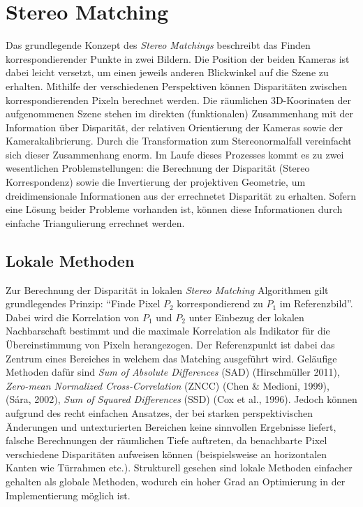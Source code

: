 \section{Stereo Matching}
\label{sec:stereo_matching}
Das grundlegende Konzept des \emph{Stereo Matchings} beschreibt das Finden korrespondierender Punkte in zwei Bildern. Die Position der beiden Kameras ist dabei leicht versetzt, um einen jeweils anderen Blickwinkel auf die Szene zu erhalten. Mithilfe der verschiedenen Perspektiven können Disparitäten zwischen korrespondierenden Pixeln berechnet werden. Die räumlichen 3D-Koorinaten der aufgenommenen Szene stehen im direkten (funktionalen) Zusammenhang mit der Information über Disparität, der  relativen Orientierung der Kameras sowie der Kamerakalibrierung. Durch die Transformation zum Stereonormalfall vereinfacht sich dieser Zusammenhang enorm. Im Laufe dieses Prozesses kommt es zu zwei wesentlichen Problemstellungen: die Berechnung der Disparität (Stereo Korrespondenz) sowie die Invertierung der projektiven Geometrie, um dreidimensionale Informationen aus der errechnetet Disparität zu erhalten. Sofern eine Lösung beider Probleme vorhanden ist, können diese Informationen durch einfache Triangulierung errechnet werden.

\subsection{Lokale Methoden}
\label{subsec:local_methods}
Zur Berechnung der Disparität in lokalen \emph{Stereo Matching} Algorithmen gilt grundlegendes Prinzip: “Finde Pixel $P_2$ korrespondierend zu $P_1$ im Referenzbild”. Dabei wird die Korrelation von $P_1$ und $P_2$ unter Einbezug der lokalen Nachbarschaft bestimmt und die maximale Korrelation als Indikator für die Übereinstimmung von Pixeln herangezogen. Der Referenzpunkt ist dabei das Zentrum eines Bereiches in welchem das Matching ausgeführt wird. Geläufige Methoden dafür sind \emph{Sum of Absolute Differences} (SAD) (Hirschmüller 2011), \emph{Zero-mean Normalized Cross-Correlation} (ZNCC) (Chen \& Medioni, 1999), (Sára, 2002), \emph{Sum of Squared Differences} (SSD) (Cox et al., 1996). Jedoch können aufgrund des recht einfachen Ansatzes, der bei starken perspektivischen Änderungen und untexturierten Bereichen keine sinnvollen Ergebnisse liefert, falsche Berechnungen der räumlichen Tiefe auftreten, da benachbarte Pixel verschiedene Disparitäten aufweisen können (beispielsweise an horizontalen Kanten wie Türrahmen etc.). Strukturell gesehen sind lokale Methoden einfacher gehalten als globale Methoden, wodurch ein hoher Grad an Optimierung in der Implementierung möglich ist.

